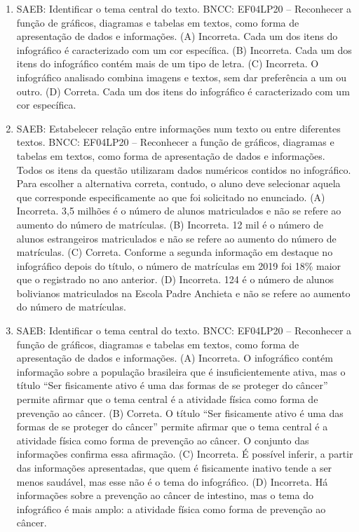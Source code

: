 \begin{enumerate}
\item
SAEB: Identificar o tema central do texto.
BNCC: EF04LP20 -- Reconhecer a função de gráficos, diagramas e tabelas em
textos, como forma de apresentação de dados e informações.
(A) Incorreta. Cada um dos itens do infográfico é caracterizado com um cor
específica. 
(B) Incorreta. Cada um dos itens do infográfico contém mais de um tipo de
letra.
(C) Incorreta. O infográfico analisado combina imagens e textos, sem dar
preferência a um ou outro.
(D) Correta. Cada um dos itens do infográfico é caracterizado com um cor
específica.

\item
SAEB: Estabelecer relação entre informações num texto ou entre
diferentes textos.
BNCC: EF04LP20 -- Reconhecer a função de gráficos, diagramas e tabelas em
textos, como forma de apresentação de dados e informações.
Todos os itens da questão utilizaram dados numéricos contidos no 
infográfico. Para escolher a alternativa correta, contudo, o aluno 
deve selecionar aquela que corresponde especificamente ao que foi
solicitado no enunciado. 
(A) Incorreta. 3,5 milhões é o número de alunos matriculados e não se 
refere ao aumento do número de matrículas.
(B) Incorreta. 12 mil é o número de alunos estrangeiros matriculados
e não se refere ao aumento do número de matrículas.
(C) Correta. Conforme a segunda informação em destaque no infográfico
depois do título, o número de matrículas em 2019 foi 18\% maior que o
registrado no ano anterior. 
(D)  Incorreta. 124 é o número de alunos bolivianos matriculados na 
Escola Padre Anchieta e não se refere ao aumento do número de matrículas.

\item
SAEB: Identificar o tema central do texto.
BNCC: EF04LP20 -- Reconhecer a função de gráficos, diagramas e tabelas em
textos, como forma de apresentação de dados e informações.
(A)  Incorreta. O infográfico contém informação sobre a população 
brasileira que é insuficientemente ativa, mas o título ``Ser fisicamente
ativo é uma das formas de se proteger do câncer'' permite afirmar que o 
tema central é a atividade física como forma de prevenção ao câncer. 
(B)  Correta. O título ``Ser fisicamente ativo é uma das formas de se
proteger do câncer'' permite afirmar que o tema central é a atividade 
física como forma de prevenção ao câncer. O conjunto das informações 
confirma essa afirmação.  
(C)  Incorreta. É possível inferir, a partir das informações apresentadas,
que quem é fisicamente inativo tende a ser menos saudável, mas esse não é
o tema do infográfico. 
(D)  Incorreta. Há informações sobre a prevenção ao câncer de intestino,
mas o tema do infográfico é mais amplo: a atividade física como forma de
prevenção ao câncer.
\end{enumerate}

